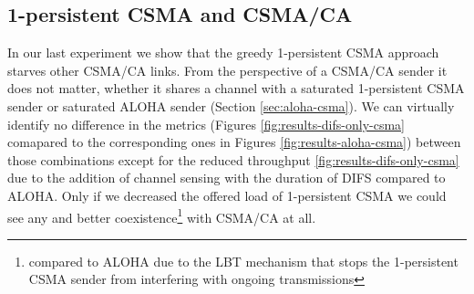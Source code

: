 \clearpage



\subsection{1-persistent CSMA and CSMA/CA}

In our last experiment we show that the greedy 1-persistent CSMA approach starves other CSMA/CA links. From the perspective of a CSMA/CA sender it does not matter, whether it shares a channel with a saturated 1-persistent CSMA sender or saturated ALOHA sender (Section \ref{sec:aloha-csma}). We can virtually identify no difference in the metrics (Figures \ref{fig:results-difs-only-csma} comapared to the corresponding ones in Figures \ref{fig:results-aloha-csma}) between those combinations except for the reduced throughput \ref{fig:results-difs-only-csma} due to the addition of channel sensing with the duration of DIFS compared to ALOHA. Only if we decreased the offered load of 1-persistent CSMA we could see any and better coexistence\footnote{compared to ALOHA due to the LBT mechanism that stops the 1-persistent CSMA sender from interfering with ongoing transmissions} with CSMA/CA at all.

